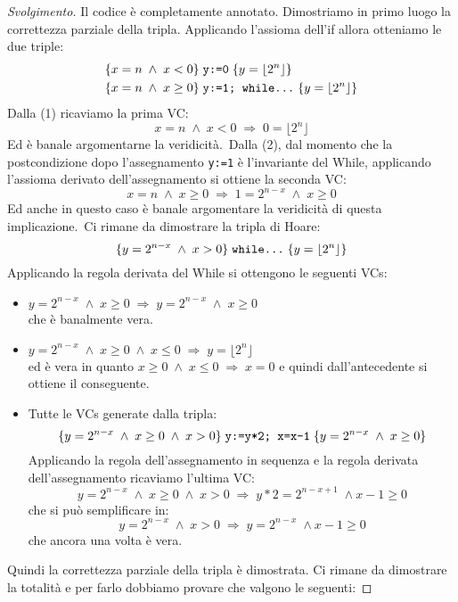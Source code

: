 \begin{proof}[Svolgimento]
Il codice è completamente annotato. Dimostriamo in primo luogo la correttezza parziale della tripla. Applicando l'assioma dell'if allora otteniamo le due triple:
\begin{align}
& \{x=n \; \land \; x<0 \} \; \text{\texttt{y:=0}} \; \{y= \lfloor 2^n \rfloor \} \\
& \{x=n \; \land \; x \geq 0 \} \; \text{\texttt{y:=1; while}} \texttt{\dots } \; \{ y= \lfloor 2^n \rfloor \}
\end{align}
Dalla (1) ricaviamo la prima VC:
$$ x = n \; \land \; x<0 \; \Rightarrow \; 0 = \lfloor 2^n \rfloor $$
Ed è banale argomentarne la veridicità.\
Dalla (2), dal momento che la postcondizione dopo l'assegnamento \texttt{y:=1} è l'invariante del While, applicando l'assioma derivato dell'assegnamento si ottiene la seconda VC:
$$ x=n \; \land \; x \geq 0 \; \Rightarrow \; 1 = 2^{n-x} \; \land \; x \geq 0 $$
Ed anche in questo caso è banale argomentare la veridicità di questa implicazione.\
Ci rimane da dimostrare la tripla di Hoare:
$$ \{ y=2^{n-x} \; \land \; x>0 \} \; \text{\texttt{while}} \texttt{\dots } \; \{y= \lfloor 2^n \rfloor \} $$
Applicando la regola derivata del While si ottengono le seguenti VCs:
\begin{itemize}
	\item $ y=2^{n-x} \; \land \; x \geq 0 \; \Rightarrow \; y=2^{n-x} \; \land \; x \geq 0 $ \\
		  che è banalmente vera.
	\item $ y=2^{n-x} \; \land \; x \geq 0 \; \land \; x \leq 0 \; \Rightarrow \; y = \lfloor 2^n \rfloor $ \\
		  ed è vera in quanto $ x \geq 0 \; \land \; x \leq 0 \; \Rightarrow \; x = 0 $ e quindi
		  dall'antecedente si ottiene il conseguente.
	\item Tutte le VCs generate dalla tripla:
		  $$ \{y=2^{n-x} \; \land \; x \geq 0 \; \land \; x>0 \} \;
		     \text{\texttt{y:=y*2; x=x-1}}
		     \; \{y=2^{n-x} \; \land \; x \geq 0 \} $$
		  Applicando la regola dell'assegnamento in sequenza e la regola derivata dell'assegnamento ricaviamo
		  l'ultima VC:
		  $$ y=2^{n-x} \; \land \;  x \geq 0 \; \land \; x>0 \;
		  	 \Rightarrow
		  	 \; y*2 = 2^{n-x+1} \; \land x-1 \geq 0 $$
		  che si può semplificare in:
		  $$ y=2^{n-x} \; \land \; x>0 \;
		  	 \Rightarrow
		  	 \; y = 2^{n-x} \; \land x-1 \geq 0 $$
		  che ancora una volta è vera.
\end{itemize}
Quindi la correttezza parziale della tripla è dimostrata. Ci rimane da dimostrare la totalità e per farlo dobbiamo provare che valgono le seguenti:

\end{proof}
